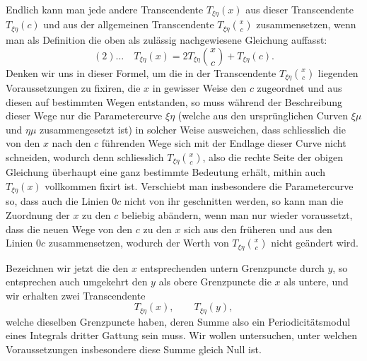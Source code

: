 \documentclass[10pt]{article}
\begin{document}
Endlich kann man jede andere Transcendente \(T_{\xi\eta}(x)\) aus dieser Transcendente \(T_{\xi\eta}(c)\) und aus der allgemeinen Transcendente \(T_{\xi\eta}\binom{x}{c}\) zusammensetzen, wenn man als Definition die oben als zulässig nachgewiesene Gleichung auffasst:
\[
(2)\ldots\quad T_{\xi\eta}(x)=2T_{\xi\eta}\binom{x}{c}+T_{\xi\eta}(c).
\]
Denken wir uns in dieser Formel, um die in der Transcendente \(T_{\xi\eta}\binom{x}{c}\) liegenden Voraussetzungen zu fixiren, die \(x\) in gewisser Weise den \(c\) zugeordnet und aus diesen auf bestimmten Wegen entstanden, so muss während der Beschreibung dieser Wege nur die Parametercurve \(\xi\eta\) (welche aus den ursprünglichen Curven \(\xi\mu\) und \(\eta\mu\) zusammengesetzt ist) in solcher Weise ausweichen, dass schliesslich die von den \(x\) nach den \(c\) führenden Wege sich mit der Endlage dieser Curve nicht schneiden, wodurch denn schliesslich \(T_{\xi\eta}\binom{x}{c}\), also die rechte Seite der obigen Gleichung überhaupt eine ganz bestimmte Bedeutung erhält, mithin auch \(T_{\xi\eta}(x)\) vollkommen fixirt ist. Verschiebt man insbesondere die Parametercurve so, dass auch die Linien \(0c\) nicht von ihr geschnitten werden, so kann man die Zuordnung der \(x\) zu den \(c\) beliebig abändern, wenn man nur wieder voraussetzt, dass die neuen Wege von den \(c\) zu den \(x\) sich aus den früheren und aus den Linien \(0c\) zusammensetzen, wodurch der Werth von \(T_{\xi\eta}\binom{x}{c}\) nicht geändert wird.

Bezeichnen wir jetzt die den \(x\) entsprechenden untern Grenzpuncte durch \(y\), so entsprechen auch umgekehrt den \(y\) als obere Grenzpuncte die \(x\) als untere, und wir erhalten zwei Transcendente
\[
T_{\xi\eta}(x),\qquad T_{\xi\eta}(y),
\]
welche dieselben Grenzpuncte haben, deren Summe also ein Periodicitätsmodul eines Integrals dritter Gattung sein muss. Wir wollen untersuchen, unter welchen Voraussetzungen insbesondere diese Summe gleich Null ist.
\end{document}
